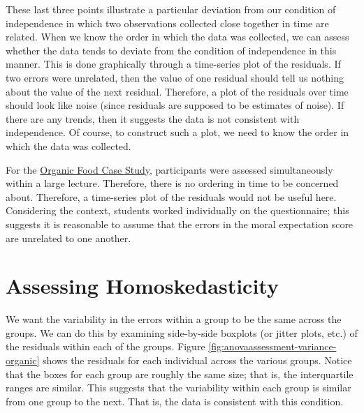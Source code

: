 \documentclass[]{book}
\theoremstyle{plain}
\theoremstyle{mydefn}
\theoremstyle{myexmpl}
\theoremstyle{remark}
\begin{document}
These last three points illustrate a particular deviation from our
condition of independence in which two observations collected close
together in time are related. When we know the order in which the data
was collected, we can assess whether the data tends to deviate from the
condition of independence in this manner. This is done graphically
through a time-series plot of the residuals. If two errors were
unrelated, then the value of one residual should tell us nothing about
the value of the next residual. Therefore, a plot of the residuals over
time should look like noise (since residuals are supposed to be
estimates of noise). If there are any trends, then it suggests the data
is not consistent with independence. Of course, to construct such a
plot, we need to know the order in which the data was collected.

For the \protect\hyperlink{CaseOrganic}{Organic Food Case Study},
participants were assessed simultaneously within a large lecture.
Therefore, there is no ordering in time to be concerned about.
Therefore, a time-series plot of the residuals would not be useful here.
Considering the context, students worked individually on the
questionnaire; this suggests it is reasonable to assume that the errors
in the moral expectation score are unrelated to one another.

\section{Assessing Homoskedasticity}\label{assessing-homoskedasticity-1}

We want the variability in the errors within a group to be the same
across the groups. We can do this by examining side-by-side boxplots (or
jitter plots, etc.) of the residuals within each of the groups. Figure
\ref{fig:anovaassessment-variance-organic} shows the residuals for each
individual across the various groups. Notice that the boxes for each
group are roughly the same size; that is, the interquartile ranges are
similar. This suggests that the variability within each group is similar
from one group to the next. That is, the data is consistent with this
condition.
\end{document}
